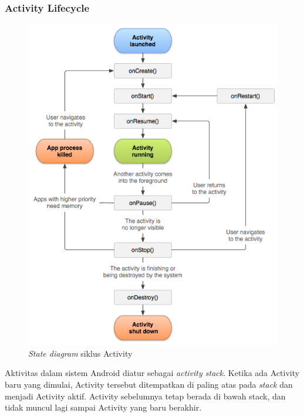\subsubsection{Activity Lifecycle}
\label{sssec:activity_lifecycle}
\begin{figure}[htbp]
	\centering
		\includegraphics[scale=0.48]{Gambar/activity-lifecycle.png}
	\caption{\textit{State diagram} siklus Activity}
	\label{fig:activity-lifecycle}
\end{figure}

Aktivitas dalam sistem Android diatur sebagai \textit{activity stack}. Ketika ada Activity baru yang dimulai, Activity tersebut ditempatkan di paling atas pada \textit{stack} dan menjadi Activity aktif. Activity sebelumnya tetap berada di bawah stack, dan tidak muncul lagi sampai Activity yang baru berakhir. 

